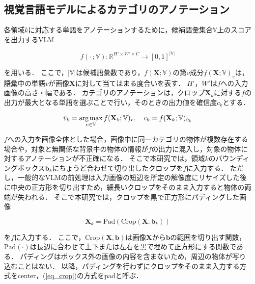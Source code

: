 \subsection{視覚言語モデルによるカテゴリのアノテーション}
各領域$ k $に対応する単語をアノテーションするために，候補語彙集合$ {\mathbb V} $上のスコアを出力するVLM

\begin{equation}
    f( \cdot \, ; {\mathbb V}) : {\mathbb R}^{H' \times W' \times C} \to [0, 1]^{|{\mathbb V}|}
    \label{eq_vlm}
\end{equation}

\noindent
を用いる．
ここで，$ |{\mathbb V}| $は候補語彙数であり，$ f({\mathbf X}; {\mathbb V}) $の第$ v $成分$ f({\mathbf X}; {\mathbb V})_v $は，語彙中の単語$ v $が画像$ {\mathbf X} $に対して当てはまる度合いを表す．
$ H' $，$ W' $は$ f $への入力画像の高さ・幅である．
カテゴリのアノテーションは，クロップ$ {\mathbf X}_k $に対する$ f $の出力が最大となる単語を選ぶことで行い，そのときの出力値を確信度$ c_k $とする．

\begin{equation}
    \hat{v}_k = \operatorname*{arg\,max}_{v \in {\mathbb V}} f({\mathbf X}_k; {\mathbb V})_v, \quad
    c_k = f({\mathbf X}_k; {\mathbb V})_{\hat{v}_k}
    \label{eq_argmax}
\end{equation}

$ f $への入力を画像全体とした場合，画像中に同一カテゴリの物体が複数存在する場合や，対象と無関係な背景中の物体の情報が$ f $の出力に混入し，対象の物体に対するアノテーションが不正確になる．
そこで本研究では，領域$ k $のバウンディングボックス$ {\mathbf b}_k $にちょうど合わせて切り出したクロップを$ f $に入力する．
ただし，一般的なVLMの前処理は入力画像の短辺を所定の解像度にリサイズした後に中央の正方形を切り出すため，細長いクロップをそのまま入力すると物体の両端が失われる．
そこで本研究では，クロップを黒で正方形にパディングした画像

\begin{equation}
    {\mathbf X}_k = \mathrm{Pad}( \mathrm{Crop}({\mathbf X}, {\mathbf b}_k) )
    \label{eq_crop}
\end{equation}

\noindent
を$ f $に入力する．
ここで，$ \mathrm{Crop}({\mathbf X}, {\mathbf b}) $は画像$ {\mathbf X} $から$ {\mathbf b} $の範囲を切り出す関数，$ \mathrm{Pad}(\cdot) $は長辺に合わせて上下または左右を黒で埋めて正方形にする関数である．
パディングはボックス外の画像の内容を含まないため，周辺の物体が写り込むことはない．
以降，パディングを行わずにクロップをそのまま入力する方式をcenter，(\ref{eq_crop})の方式をpadと呼ぶ．


